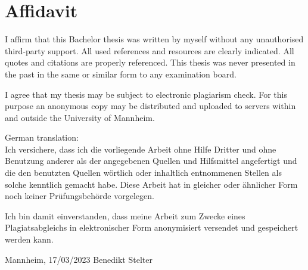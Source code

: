 \documentclass{scrbook}
\begin{document}
\chapter{Affidavit}
\thispagestyle{empty}

I affirm that this Bachelor thesis was written by myself without any unauthorised third-party support. All used references and resources are clearly indicated. All quotes and citations are properly referenced. This thesis was never presented in the past in the same or similar form to any examination board. 

\noindent I agree that my thesis may be subject to electronic plagiarism check. For this purpose an anonymous copy may be distributed and uploaded to
servers within and outside the University of Mannheim.

\vspace{2\baselineskip}

\noindent German translation:\\
Ich versichere, dass ich die vorliegende Arbeit ohne Hilfe Dritter und ohne Benutzung anderer
als der angegebenen Quellen und Hilfsmittel angefertigt und die den benutzten Quellen
wörtlich oder inhaltlich entnommenen Stellen als solche kenntlich gemacht habe. Diese Arbeit
hat in gleicher oder ähnlicher Form noch keiner Prüfungsbehörde vorgelegen.

\noindent Ich bin damit einverstanden, dass meine Arbeit zum Zwecke eines Plagiatsabgleichs in
elektronischer Form anonymisiert versendet und gespeichert werden kann.

\vspace{4\baselineskip}
\begin{center}
\parbox{.8\textwidth}{Mannheim, 17/03/2023 \hfill Benedikt Stelter}
\end{center}


 
\end{document}
